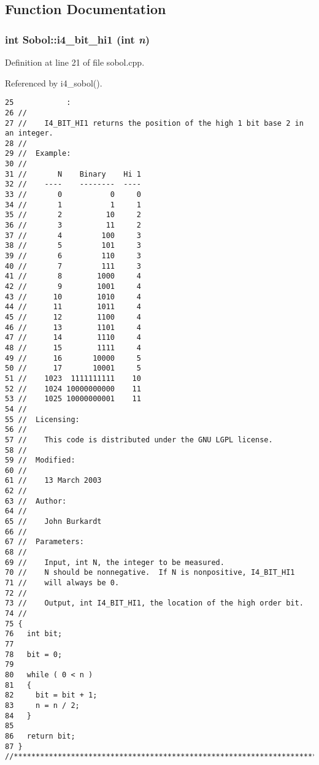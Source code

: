 \subsection{Function Documentation}
\subsubsection{\setlength{\rightskip}{0pt plus 5cm}int Sobol::i4\_\-bit\_\-hi1 (int {\em n})}\label{namespaceSobol_9264843c48d702dcb9da807c42d73088}




Definition at line 21 of file sobol.cpp.

Referenced by i4\_\-sobol().

\begin{Code}\begin{verbatim}25            :
26 //
27 //    I4_BIT_HI1 returns the position of the high 1 bit base 2 in an integer.
28 //
29 //  Example:
30 //
31 //       N    Binary    Hi 1
32 //    ----    --------  ----
33 //       0           0     0
34 //       1           1     1
35 //       2          10     2
36 //       3          11     2 
37 //       4         100     3
38 //       5         101     3
39 //       6         110     3
40 //       7         111     3
41 //       8        1000     4
42 //       9        1001     4
43 //      10        1010     4
44 //      11        1011     4
45 //      12        1100     4
46 //      13        1101     4
47 //      14        1110     4
48 //      15        1111     4
49 //      16       10000     5
50 //      17       10001     5
51 //    1023  1111111111    10
52 //    1024 10000000000    11
53 //    1025 10000000001    11
54 //
55 //  Licensing:
56 //
57 //    This code is distributed under the GNU LGPL license. 
58 //
59 //  Modified:
60 //
61 //    13 March 2003
62 //
63 //  Author:
64 //
65 //    John Burkardt
66 //
67 //  Parameters:
68 //
69 //    Input, int N, the integer to be measured.
70 //    N should be nonnegative.  If N is nonpositive, I4_BIT_HI1
71 //    will always be 0.
72 //
73 //    Output, int I4_BIT_HI1, the location of the high order bit.
74 //
75 {
76   int bit;
77 
78   bit = 0;
79 
80   while ( 0 < n )
81   {
82     bit = bit + 1;
83     n = n / 2;
84   }
85 
86   return bit;
87 }
//****************************************************************************80
\end{verbatim}
\end{Code}


